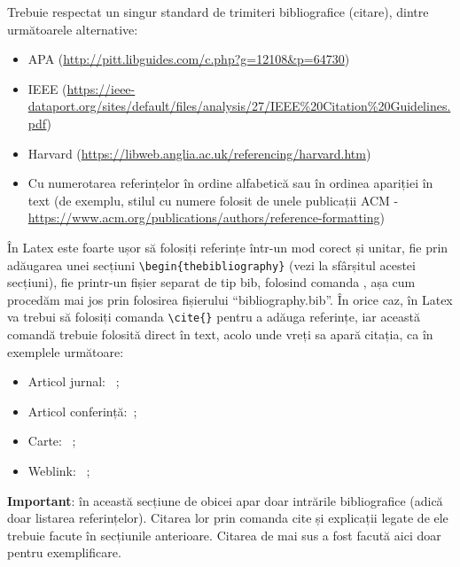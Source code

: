 \documentclass[12pt,a4paper]{report}
\begin{document}
Trebuie respectat un singur standard de trimiteri bibliografice (citare), dintre următoarele alternative:
\begin{itemize}
	\item APA (\url{http://pitt.libguides.com/c.php?g=12108\&p=64730})
	\item IEEE (\url{https://ieee-dataport.org/sites/default/files/analysis/27/IEEE\%20Citation\%20Guidelines.pdf}) 
	\item Harvard (\url{https://libweb.anglia.ac.uk/referencing/harvard.htm})
	\item Cu numerotarea referințelor în ordine alfabetică sau în ordinea apariției în text (de exemplu, stilul cu numere folosit de unele publicații ACM - \url{https://www.acm.org/publications/authors/reference-formatting}) 
\end{itemize}

În Latex este foarte ușor să folosiți referințe într-un mod corect și unitar, fie prin adăugarea unei secțiuni
\verb!\begin{thebibliography}!
(vezi la sfârșitul acestei secțiuni), fie printr-un fișier separat de tip bib, folosind comanda
\verb!!,
așa cum procedăm mai jos prin folosirea fișierului ``bibliography.bib''. În orice caz, în Latex va trebui să folosiți comanda
\verb!\cite{}!
pentru a adăuga referințe, iar această comandă trebuie folosită direct în text, acolo unde vreți sa apară citația, ca în exemplele următoare:
\begin{itemize}
	\item Articol jurnal: ~\cite{article};
	\item Articol conferință:~\cite{proc};
	\item Carte: ~\cite{book};
	\item Weblink: ~\cite{silva};
\end{itemize}

\textbf{Important}: în această secțiune de obicei apar doar intrările bibliografice (adică doar listarea referințelor). Citarea lor prin comanda cite și explicații legate de ele trebuie facute în secțiunile anterioare. Citarea de mai sus a fost facută aici doar pentru exemplificare.




\end{document}
